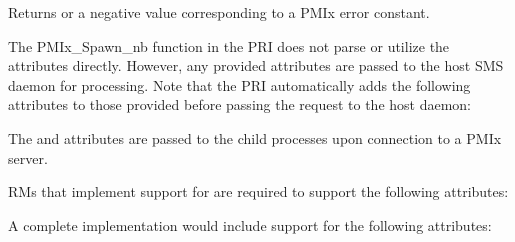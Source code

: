 Returns  or a negative value corresponding to a PMIx error constant.

\priattr
The PMIx_Spawn_nb function in the \ac{PRI} does not parse or utilize the attributes directly. However, any provided attributes are passed to the host \ac{SMS} daemon for processing. Note that the \ac{PRI} automatically adds the following attributes to those provided before passing the request to the host daemon:


The  and  attributes are passed to the child processes upon connection to a PMIx server.

\reqattr
\acp{RM} that implement support for  are required to support the following attributes:


\optattr
A complete implementation would include support for the following attributes:


\descr

